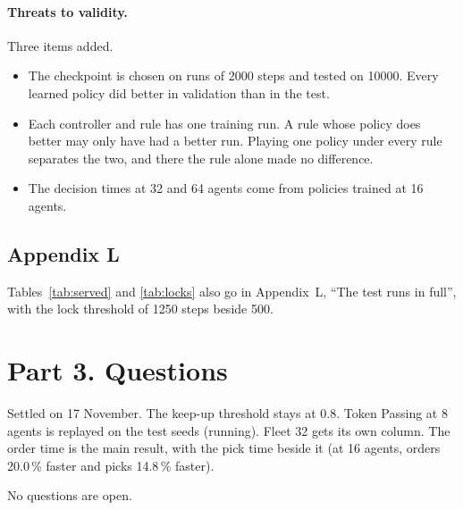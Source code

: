 \documentclass[11pt,a4paper]{article}
\begin{document}
\paragraph{Threats to validity.}
Three items added.
\begin{itemize}[leftmargin=1.2em]
  \item The checkpoint is chosen on runs of 2000 steps and tested on 10000. Every learned policy did
    better in validation than in the test.
  \item Each controller and rule has one training run. A rule whose policy does better may only have
    had a better run. Playing one policy under every rule separates the two, and there the rule alone
    made no difference.
  \item The decision times at 32 and 64 agents come from policies trained at 16 agents.
\end{itemize}

\subsection*{Appendix L}
Tables~\ref{tab:served} and \ref{tab:locks} also go in Appendix~L, ``The test runs in full'', with the
lock threshold of 1250 steps beside 500.

\section*{Part 3. Questions}

Settled on 17 November. The keep-up threshold stays at 0.8. Token Passing at 8 agents is replayed
on the test seeds (running). Fleet 32 gets its own column. The order time is the main result, with
the pick time beside it (at 16 agents, orders 20.0\,\% faster and picks 14.8\,\% faster).

No questions are open.
\end{document}
